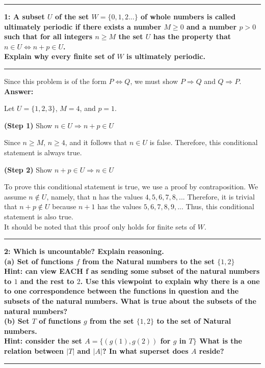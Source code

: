 \documentclass[11pt]{article}
\newcommand\question[2]{\vspace{.25in}\hrule\textbf{#1: #2}\vspace{.5em}\hrule\vspace{.10in}}
\renewcommand\part[1]{\vspace{.10in}\textbf{(#1)}}
\newcommand\answer{\vspace{.10in}\textbf{Answer: }}
\begin{document}
\raggedright
\newcommand\NAME{Stewart Dulaney}  %
\newcommand\SID{1545566}     %
\newcommand\HWNUM{6}              %

\question{1}{A subset $U$ of the set $W = \{0, 1, 2...\}$ of whole numbers is called ultimately periodic if there exists a number $M \geq 0$ and a number $p > 0$ such that for all integers $n \geq M$ the set $U$ has the property that $n \in U \iff n + p \in U$.\\[\baselineskip]Explain why every finite set of $W$ is ultimately periodic.} 

Since this problem is of the form $P \Leftrightarrow Q$, we must show $P \Rightarrow Q$ and $Q \Rightarrow P$.\\[\baselineskip]

\answer

Let $U = \{1, 2, 3\}$, $M = 4$, and $p = 1$.

\part{Step 1} Show $n \in U \Rightarrow n + p \in U$

Since $n \geq M$, $n \geq 4$, and it follows that $n \in U$ is false. Therefore, this conditional statement is always true.

\part{Step 2} Show $n + p \in U \Rightarrow n \in U$

To prove this conditional statement is true, we use a proof by contraposition. We assume $n \notin U$, namely, that n has the values $4, 5, 6, 7, 8,...$ Therefore, it is trivial that $n + p \notin U$ because $n + 1$ has the values $5, 6, 7, 8, 9,...$ Thus, this conditional statement is also true.\\[\baselineskip]

It should be noted that this proof only holds for finite sets of $W$.

\question{2}{Which is uncountable? Explain reasoning.\\[\baselineskip](a) Set of functions $f$ from the Natural numbers to the set $\{1, 2\}$\\ Hint: can view EACH f as sending some subset of the natural numbers to $1$ and the rest to $2$. Use this viewpoint to explain why there is a one to one correspondence between the functions in question and the subsets of the natural numbers. What is true about the subsets of the natural numbers?\\[\baselineskip](b) Set $T$ of functions $g$ from the set $\{1, 2\}$ to the set of Natural numbers.\\Hint: consider the set $A = \{ (g(1),g(2))$ for $g$ in $T \}$ What is the relation between $|T|$ and $|A|$?  In what superset does $A$ reside?} 
\end{document}
